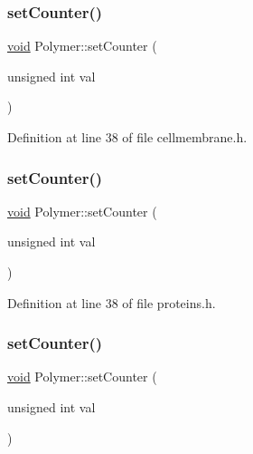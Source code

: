 \subsubsection{\texorpdfstring{set\+Counter()}{setCounter()}\hspace{0.1cm}{\footnotesize\ttfamily [2/10]}}
{\footnotesize\ttfamily \mbox{\hyperlink{glad_8h_a950fc91edb4504f62f1c577bf4727c29}{void}} Polymer\+::set\+Counter (\begin{DoxyParamCaption}\item[{unsigned int}]{val }\end{DoxyParamCaption})\hspace{0.3cm}{\ttfamily [inline]}}



Definition at line 38 of file cellmembrane.\+h.

\mbox{\label{class_polymer_a7ed6bbe09a570b59f9253d63fd3326d2}} 
\subsubsection{\texorpdfstring{set\+Counter()}{setCounter()}\hspace{0.1cm}{\footnotesize\ttfamily [3/10]}}
{\footnotesize\ttfamily \mbox{\hyperlink{glad_8h_a950fc91edb4504f62f1c577bf4727c29}{void}} Polymer\+::set\+Counter (\begin{DoxyParamCaption}\item[{unsigned int}]{val }\end{DoxyParamCaption})\hspace{0.3cm}{\ttfamily [inline]}}



Definition at line 38 of file proteins.\+h.

\mbox{\label{class_polymer_a7ed6bbe09a570b59f9253d63fd3326d2}} 
\subsubsection{\texorpdfstring{set\+Counter()}{setCounter()}\hspace{0.1cm}{\footnotesize\ttfamily [4/10]}}
{\footnotesize\ttfamily \mbox{\hyperlink{glad_8h_a950fc91edb4504f62f1c577bf4727c29}{void}} Polymer\+::set\+Counter (\begin{DoxyParamCaption}\item[{unsigned int}]{val }\end{DoxyParamCaption})\hspace{0.3cm}{\ttfamily [inline]}}



